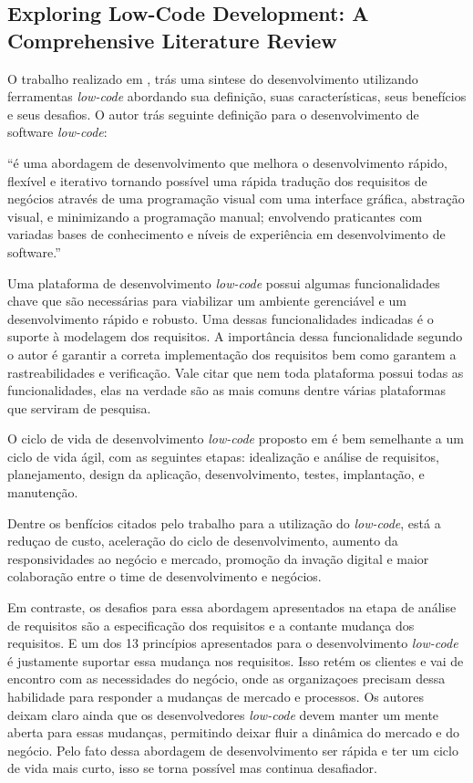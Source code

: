 {		\subsection{Exploring Low-Code Development: A Comprehensive Literature Review}

		O trabalho realizado em \cite{LowCodeExploring}, trás uma sintese do desenvolvimento utilizando
		ferramentas \textit{low-code} abordando sua definição, suas características, seus benefícios e seus desafios.
		O autor trás seguinte definição para o desenvolvimento de software \textit{low-code}:

		``é uma abordagem de desenvolvimento que melhora o desenvolvimento rápido, flexível e iterativo tornando possível
		uma rápida tradução dos requisitos de negócios através de uma programação visual com uma interface gráfica, abstração visual, 
		e minimizando a programação manual; envolvendo praticantes com variadas bases de conhecimento e níveis de experiência em 
		desenvolvimento de software.''

		Uma plataforma de desenvolvimento \textit{low-code} possui algumas funcionalidades chave que são necessárias para viabilizar um 
		ambiente gerenciável e um desenvolvimento rápido e robusto. Uma dessas funcionalidades indicadas é o suporte à modelagem dos requisitos. A importância dessa funcionalidade segundo 
		o autor é garantir a correta implementação dos requisitos bem como garantem a rastreabilidades e verificação. Vale citar que nem toda plataforma possui todas as funcionalidades, elas na 
		verdade são as mais comuns dentre várias plataformas que serviram de pesquisa.

		O ciclo de vida de desenvolvimento \textit{low-code} proposto em \cite{LowCodeExploring} é bem semelhante a um ciclo de vida ágil, com as seguintes etapas: idealização e análise 
		de requisitos, planejamento, design da aplicação, desenvolvimento, testes, implantação, e manutenção.

		Dentre os benfícios citados pelo trabalho para a utilização do \textit{low-code}, está a reduçao de custo, aceleração do ciclo de desenvolvimento, aumento da responsividades 
		ao negócio e mercado, promoção da invação digital e maior colaboração entre o time de desenvolvimento e negócios.

		Em contraste, os desafios para essa abordagem apresentados na etapa de análise de requisitos são a especificação dos requisitos e a contante mudança dos requisitos. E um dos 13 princípios 
		apresentados para o desenvolvimento \textit{low-code} é justamente suportar essa mudança nos requisitos. Isso retém os clientes e vai de encontro com as necessidades do negócio, 
		onde as organizaçoes precisam dessa habilidade para responder a mudanças de mercado e processos. Os autores deixam claro ainda que os desenvolvedores \textit{low-code} devem manter um mente aberta
		para essas mudanças, permitindo deixar fluir a dinâmica do mercado e do negócio. Pelo fato dessa abordagem de desenvolvimento ser rápida e ter um ciclo de vida mais curto, isso se torna possível 
		mas continua desafiador. 
	}